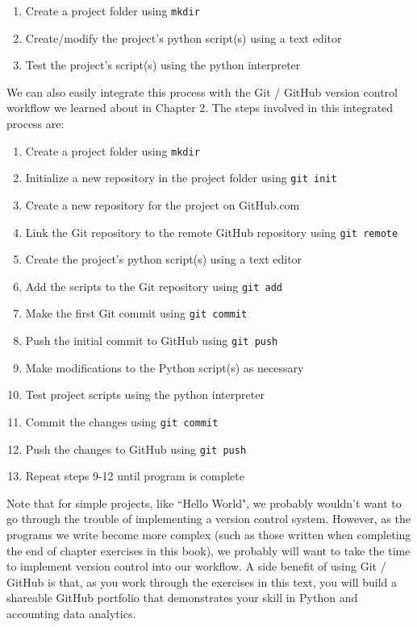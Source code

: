 \documentclass{book}
\begin{document}
\begin{enumerate}
	\item Create a project folder using \texttt{mkdir}
	\item Create/modify the project's python script(s) using a text editor
	\item Test the project's script(s) using the python interpreter
\end{enumerate}

We can also easily integrate this process with the Git / GitHub version control workflow we learned about in Chapter 2. The steps involved in this integrated process are:

\begin{enumerate}
	\item Create a project folder using \texttt{mkdir}
	\item Initialize a new repository in the project folder using \texttt{git init}
	\item Create a new repository for the project on GitHub.com
	\item Link the Git repository to the remote GitHub repository using \texttt{git remote}
	\item Create the project's python script(s) using a text editor
	\item Add the scripts to the Git repository using \texttt{git add}
	\item Make the first Git commit using \texttt{git commit}
	\item Push the initial commit to GitHub using \texttt{git push}
	\item Make modifications to the Python script(s) as necessary
	\item Test project scripts using the python interpreter
	\item Commit the changes using \texttt{git commit}
	\item Push the changes to GitHub using \texttt{git push}
	\item Repeat steps 9-12 until program is complete
\end{enumerate}

Note that for simple projects, like ``Hello World", we probably wouldn't want to go through the trouble of implementing a version control system. However, as the programs we write become more complex (such as those written when completing the end of chapter exercises in this book), we probably will want to take the time to implement version control into our workflow. A side benefit of using Git / GitHub is that, as you work through the exercises in this text, you will build a shareable GitHub portfolio that demonstrates your skill in Python and accounting data analytics. 
\end{document}
